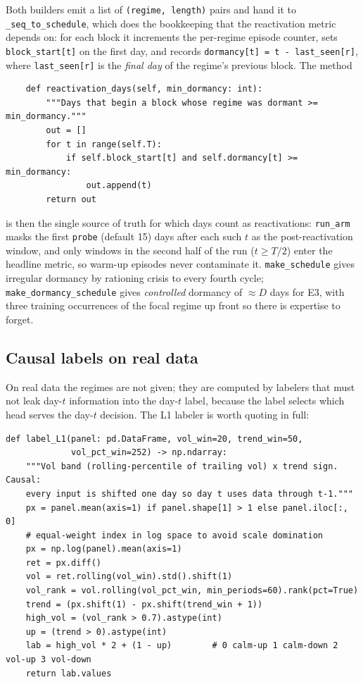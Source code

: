 Both builders emit a list of \texttt{(regime, length)} pairs and hand it to
\texttt{\_seq\_to\_schedule}, which does the bookkeeping that the
reactivation metric depends on: for each block it increments the per-regime
episode counter, sets \texttt{block\_start[t]} on the first day, and records
\texttt{dormancy[t] = t - last\_seen[r]}, where \texttt{last\_seen[r]} is
the \emph{final day} of the regime's previous block. The method
\begin{lstlisting}
    def reactivation_days(self, min_dormancy: int):
        """Days that begin a block whose regime was dormant >= min_dormancy."""
        out = []
        for t in range(self.T):
            if self.block_start[t] and self.dormancy[t] >= min_dormancy:
                out.append(t)
        return out
\end{lstlisting}
is then the single source of truth for which days count as reactivations:
\texttt{run\_arm} masks the first \texttt{probe} (default 15) days after
each such $t$ as the post-reactivation window, and only windows in the
second half of the run ($t \ge T/2$) enter the headline metric, so warm-up
episodes never contaminate it. \texttt{make\_schedule} gives irregular
dormancy by rationing crisis to every fourth cycle;
\texttt{make\_dormancy\_schedule} gives \emph{controlled} dormancy of
$\approx D$ days for E3, with three training occurrences of the focal
regime up front so there is expertise to forget.

\subsection{Causal labels on real data}
\label{sec:dd6-labels}

On real data the regimes are not given; they are computed by labelers that
must not leak day-$t$ information into the day-$t$ label, because the label
selects which head serves the day-$t$ decision. The L1 labeler is worth
quoting in full:

\begin{lstlisting}[caption={The L1 causal labeler (\texttt{realdata.py}).},label={lst:dd6-l1}]
def label_L1(panel: pd.DataFrame, vol_win=20, trend_win=50,
             vol_pct_win=252) -> np.ndarray:
    """Vol band (rolling-percentile of trailing vol) x trend sign. Causal:
    every input is shifted one day so day t uses data through t-1."""
    px = panel.mean(axis=1) if panel.shape[1] > 1 else panel.iloc[:, 0]
    # equal-weight index in log space to avoid scale domination
    px = np.log(panel).mean(axis=1)
    ret = px.diff()
    vol = ret.rolling(vol_win).std().shift(1)
    vol_rank = vol.rolling(vol_pct_win, min_periods=60).rank(pct=True)
    trend = (px.shift(1) - px.shift(trend_win + 1))
    high_vol = (vol_rank > 0.7).astype(int)
    up = (trend > 0).astype(int)
    lab = high_vol * 2 + (1 - up)        # 0 calm-up 1 calm-down 2 vol-up 3 vol-down
    return lab.values
\end{lstlisting}

